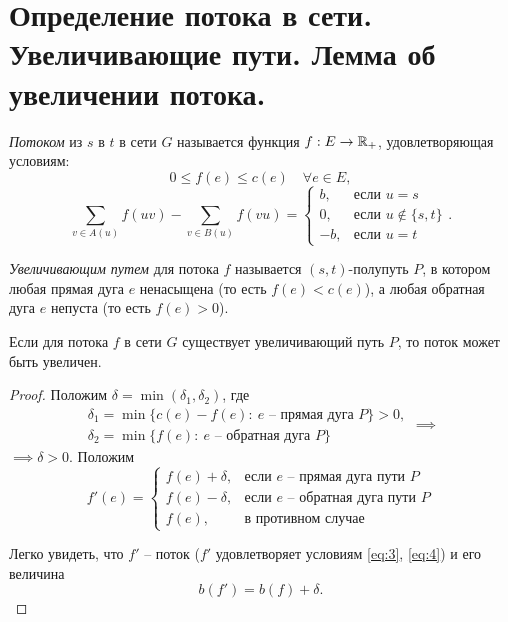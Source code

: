 \section{Определение потока в сети. Увеличивающие пути. Лемма об увеличении потока.}

\begin{definition}
    \emph{Потоком} из $ s $ в $ t $ в сети $ G $ называется функция $ f: E \rightarrow \mathbb{R}_+ $, удовлетворяющая условиям:
    \begin{equation}\label{eq:3}
        0 \leqslant f(e) \leqslant c(e) \quad \forall e \in E,
    \end{equation}
    \begin{equation}\label{eq:4}
        \sum_{v\in A(u)}f(uv) - \sum_{v\in B(u)}f(vu) = \left\{\begin{array}{ll}
            b,  & \text{если }u = s            \\
            0,  & \text{если }u \notin \{s,t\} \\
            -b, & \text{если }u = t
        \end{array}\right..
    \end{equation}
\end{definition}

\begin{definition}
    \emph{Увеличивающим путем} для потока $ f $ называется $ (s,t) $-полупуть $ P $, в котором любая прямая дуга $ e $ ненасыщена (то есть $ f(e) < c(e) $), а любая обратная дуга $ e $ непуста (то есть $ f(e) > 0 $).
\end{definition}

\begin{lemma}
    Если для потока $ f $ в сети $ G $ существует увеличивающий путь $ P $, то поток может быть увеличен.
\end{lemma}

\begin{proof}
    Положим $ \delta = \min(\delta_1,\delta_2) $, где
    \[
        \begin{array}{l}
            \delta_1 = \min\{c(e) - f(e): \ e \text{ -- прямая дуга }P\}>0, \\
            \delta_2 = \min\{f(e): \ e \text{ -- обратная дуга }P\}
        \end{array} \implies
    \]
    $ \implies \delta > 0 $. Положим
    \[
        f'(e) = \left\{\begin{array}{ll}
            f(e)+\delta, & \text{если }e \text{ -- прямая дуга пути }P   \\
            f(e)-\delta, & \text{если }e \text{ -- обратная дуга пути }P \\
            f(e),        & \text{в противном случае}
        \end{array}\right.
    \]

    Легко увидеть, что $ f' $ -- поток ($ f' $ удовлетворяет условиям \ref{eq:3}, \ref{eq:4}) и его величина
    \[
        b(f') = b(f) + \delta.
    \]
\end{proof}

